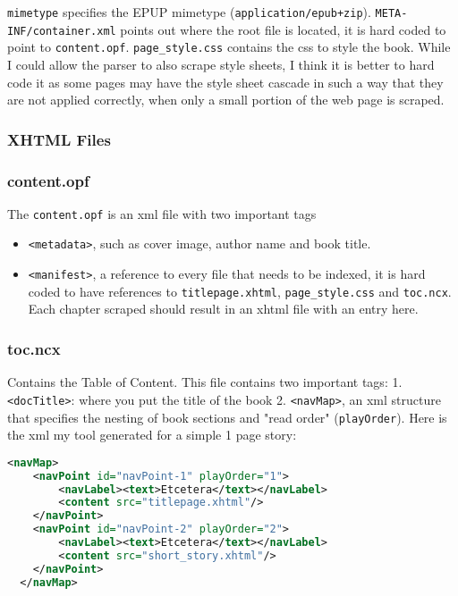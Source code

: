 \documentclass[]{report}   %
\begin{document}
\texttt{mimetype} specifies the EPUP mimetype (\texttt{application/epub+zip}).
\texttt{META-INF/container.xml} points out where the root file is located, it
is hard coded to point to \texttt{content.opf}. \texttt{page\_style.css}
contains the css to style the book. While I could allow the parser to also
scrape style sheets, I think it is better to hard code it as some pages may
have the style sheet cascade in such a way that they are not applied correctly,
when only a small portion of the web page is scraped.

\subsubsection{XHTML Files}

\subsubsection{content.opf}
The \texttt{content.opf} is an xml file with two important tags
\begin{itemize}
    \item \texttt{<metadata>}, such as cover image, author name and book title.
    \item \texttt{<manifest>}, a reference to every file that needs to be
        indexed, it is hard coded to have references to \texttt{titlepage.xhtml}, \texttt{page\_style.css} and \texttt{toc.ncx}. Each chapter scraped should result in an xhtml file with an entry here.
\end{itemize}

\subsubsection{toc.ncx}
Contains the Table of Content. This file contains two important tags: 
1. \texttt{<docTitle>}: where you put the title of the book
2. \texttt{<navMap>}, an xml structure that specifies the nesting of book sections and "read order" (\texttt{playOrder}). Here is the xml my tool generated for a simple 1 page story:

\begin{lstlisting}[language=XML]
<navMap>
    <navPoint id="navPoint-1" playOrder="1">
        <navLabel><text>Etcetera</text></navLabel>
        <content src="titlepage.xhtml"/>
    </navPoint>
    <navPoint id="navPoint-2" playOrder="2">
        <navLabel><text>Etcetera</text></navLabel>
        <content src="short_story.xhtml"/>
    </navPoint>
  </navMap>
\end{lstlisting}
\end{document}
